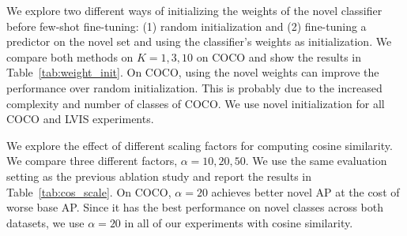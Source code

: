 We explore two different ways of initializing the weights of the novel classifier before few-shot fine-tuning: (1) random initialization and (2) fine-tuning a predictor on the novel set and using the classifier's weights as initialization. We compare both methods on $K=1,3,10$ on COCO and show the results in Table~\ref{tab:weight_init}. 
On COCO, using the novel weights can improve the performance over random initialization. This is probably due to the increased complexity and number of classes of COCO. We use novel initialization for all COCO and LVIS experiments.

We explore the effect of different scaling factors for computing cosine similarity. We compare three different factors, $\alpha=10,20,50$. We use the same evaluation setting as the previous ablation study and report the results in Table~\ref{tab:cos_scale}. On COCO, $\alpha=20$ achieves better novel AP at the cost of worse base AP. Since it has the best performance on novel classes across both datasets, we use $\alpha=20$ in all of our experiments with cosine similarity.


\begin{table}[!h]
	\centering
	\footnotesize
	\setlength{\tabcolsep}{0.4em}
	\caption{Ablation of weight initialization of the novel classifier. \vspace{2mm}}
	\label{tab:weight_init} 
\end{table}

